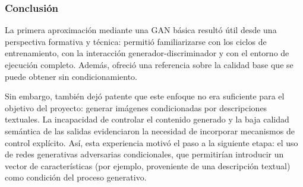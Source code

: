\subsubsection{Conclusión}

La primera aproximación mediante una GAN básica resultó útil desde una perspectiva formativa y técnica: permitió familiarizarse con los ciclos de entrenamiento, con la interacción generador-discriminador y con el entorno de ejecución completo. Además, ofreció una referencia sobre la calidad base que se puede obtener sin condicionamiento.

Sin embargo, también dejó patente que este enfoque no era suficiente para el objetivo del proyecto: generar imágenes condicionadas por descripciones textuales. La incapacidad de controlar el contenido generado y la baja calidad semántica de las salidas evidenciaron la necesidad de incorporar mecanismos de control explícito. Así, esta experiencia motivó el paso a la siguiente etapa: el uso de redes generativas adversarias condicionales, que permitirían introducir un vector de características (por ejemplo, proveniente de una descripción textual) como condición del proceso generativo.
